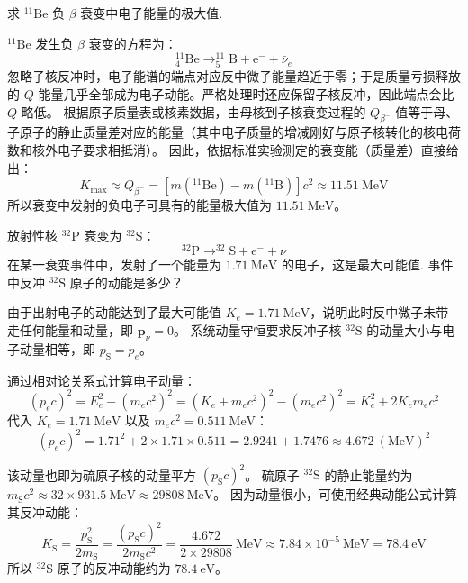 \begin{exercise}\label{ex:29.23}
求 $^{11}\mathrm{Be}$ 负 $\beta$ 衰变中电子能量的极大值.
\end{exercise}
\begin{solution}
$^{11}\mathrm{Be}$ 发生负 $\beta$ 衰变的方程为：
$$ ^{11}_{4}\mathrm{Be} \rightarrow ^{11}_{5}\mathrm{B} + \mathrm{e}^- + \bar{\nu}_e $$
忽略子核反冲时，电子能谱的端点对应反中微子能量趋近于零；于是质量亏损释放的 $Q$ 能量几乎全部成为电子动能。严格处理时还应保留子核反冲，因此端点会比 $Q$ 略低。
根据原子质量表或核素数据，由母核到子核衰变过程的 $Q_{\beta^-}$ 值等于母、子原子的静止质量差对应的能量（其中电子质量的增减刚好与原子核转化的核电荷数和核外电子要求相抵消）。
因此，依据标准实验测定的衰变能（质量差）直接给出：
$$ K_{\max} \approx Q_{\beta^-} = [m(^{11}\mathrm{Be}) - m(^{11}\mathrm{B})] c^2 \approx 11.51 \ \mathrm{MeV} $$
所以衰变中发射的负电子可具有的能量极大值为 $11.51 \ \mathrm{MeV}$。
\end{solution}

\begin{exercise}\label{ex:29.24}
放射性核 $^{32}\mathrm{P}$ 衰变为 $^{32}\mathrm{S}$：
$$ ^{32}\mathrm{P} \rightarrow ^{32}\mathrm{S} + \mathrm{e}^- + \nu $$
在某一衰变事件中，发射了一个能量为 $1.71 \ \mathrm{MeV}$ 的电子，这是最大可能值. 事件中反冲 $^{32}\mathrm{S}$ 原子的动能是多少？
\end{exercise}
\begin{solution}
由于出射电子的动能达到了最大可能值 $K_e = 1.71 \ \mathrm{MeV}$，说明此时反中微子未带走任何能量和动量，即 $\boldsymbol{p}_\nu = 0$。
系统动量守恒要求反冲子核 $^{32}\mathrm{S}$ 的动量大小与电子动量相等，即 $p_{\mathrm{S}} = p_e$。

通过相对论关系式计算电子动量：
$$ (p_e c)^2 = E_e^2 - (m_e c^2)^2 = (K_e + m_e c^2)^2 - (m_e c^2)^2 = K_e^2 + 2 K_e m_e c^2 $$
代入 $K_e = 1.71 \ \mathrm{MeV}$ 以及 $m_e c^2 = 0.511 \ \mathrm{MeV}$：
$$ (p_e c)^2 = 1.71^2 + 2 \times 1.71 \times 0.511 = 2.9241 + 1.7476 \approx 4.672 \ (\mathrm{MeV})^2 $$

该动量也即为硫原子核的动量平方 $(p_{\mathrm{S}} c)^2$。
硫原子 $^{32}\mathrm{S}$ 的静止能量约为 $m_{\mathrm{S}} c^2 \approx 32 \times 931.5 \ \mathrm{MeV} \approx 29808 \ \mathrm{MeV}$。
因为动量很小，可使用经典动能公式计算其反冲动能：
$$ K_{\mathrm{S}} = \frac{p_{\mathrm{S}}^2}{2m_{\mathrm{S}}} = \frac{(p_{\mathrm{S}} c)^2}{2 m_{\mathrm{S}} c^2} = \frac{4.672}{2 \times 29808} \ \mathrm{MeV} \approx 7.84 \times 10^{-5} \ \mathrm{MeV} = 78.4 \ \mathrm{eV} $$
所以 $^{32}\mathrm{S}$ 原子的反冲动能约为 $78.4 \ \mathrm{eV}$。
\end{solution}

